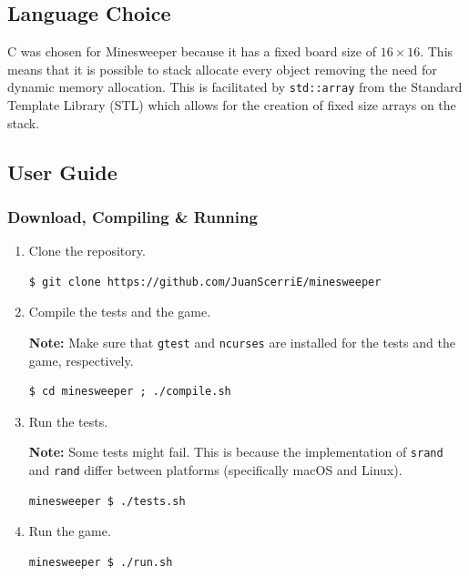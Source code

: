\documentclass[12pt]{article}
\def\cpp{{C\nolinebreak[4]\hspace{-.05em}\raisebox{.4ex}{\tiny\bf ++}}}
\begin{document}
\subsection{Language Choice}

\cpp{} was chosen for Minesweeper because it has a fixed board
size of $16 \times 16$. This means that it is possible to stack
allocate every object removing the need for dynamic memory
allocation. This is facilitated by \texttt{std::array} from the
Standard Template Library (STL) which allows for the creation of
fixed size arrays on the stack.

\subsection{User Guide}

\subsubsection{Download, Compiling \& Running}

\begin{enumerate}
\item
    Clone the repository.
\begin{lstlisting}
$ git clone https://github.com/JuanScerriE/minesweeper
\end{lstlisting}

\item
    Compile the tests and the game.

    \textbf{Note:} Make sure that \texttt{gtest} and
    \texttt{ncurses} are installed for the tests and the game,
    respectively.
\begin{lstlisting}
$ cd minesweeper ; ./compile.sh
\end{lstlisting}

\item
    Run the tests.

    \textbf{Note:} Some tests might fail. This is because the
    implementation of \texttt{srand} and \texttt{rand} differ
    between platforms (specifically macOS and Linux).
\begin{lstlisting}
minesweeper $ ./tests.sh
\end{lstlisting}

\item
    Run the game.
\begin{lstlisting}
minesweeper $ ./run.sh
\end{lstlisting}

\end{enumerate}
\end{document}
